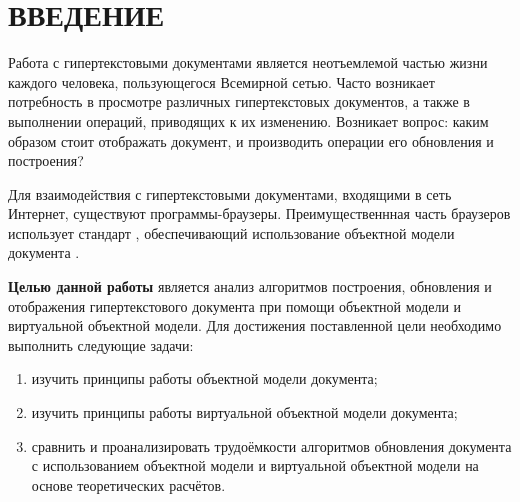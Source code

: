 \section*{ВВЕДЕНИЕ}

Работа с гипертекстовыми документами является неотъемлемой частью жизни каждого человека, пользующегося Всемирной сетью.
Часто возникает потребность в просмотре различных гипертекстовых документов, а также в выполнении операций, приводящих к их изменению.
Возникает вопрос: каким образом стоит отображать документ, и производить операции его обновления и построения?

Для взаимодействия с гипертекстовыми документами, входящими в сеть Интернет, существуют программы-браузеры.
Преимущественнная часть браузеров использует стандарт \cite{dom-doc}, обеспечивающий использование объектной модели документа \cite{dom}. 


\textbf{Целью данной работы} является анализ алгоритмов построения, обновления и отображения гипертекстового документа при помощи объектной модели и виртуальной объектной модели.
Для достижения поставленной цели необходимо выполнить следующие задачи:

\begin{enumerate}[label=\arabic*)]
	\item изучить принципы работы объектной модели документа;
	\item изучить принципы работы виртуальной объектной модели документа;
	\item сравнить и проанализировать трудоёмкости алгоритмов обновления документа с использованием объектной модели и виртуальной объектной модели на основе теоретических расчётов.
\end{enumerate}


\pagebreak